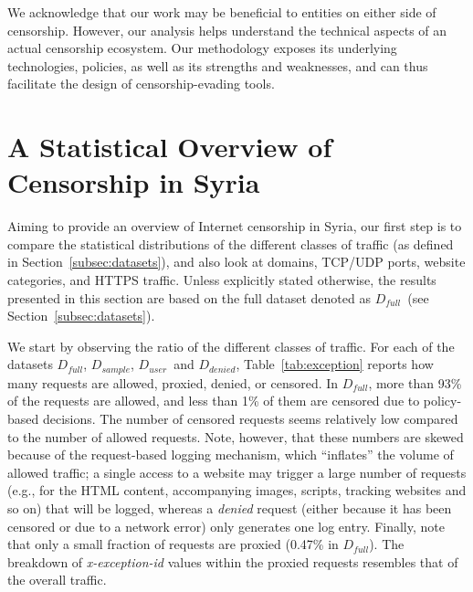 \documentclass{sig-alternate-2013}
\newcommand{\descr}[1]{\smallskip\noindent{\bf #1}}
\def\df{$D_{full}$\xspace}
\def\dd{$D_{denied}$\xspace}
\def\du{$D_{user}$\xspace}
\def\ds{$D_{sample}$\xspace}
\begin{document}
We acknowledge that our work may be beneficial to entities on 
either side of censorship. However, our analysis helps understand the technical aspects of an actual censorship ecosystem. Our methodology exposes its
underlying technologies, policies, as well as its strengths and weaknesses, and can thus facilitate the design of censorship-evading tools.







\section{A Statistical Overview of\\ Censorship in Syria}
\label{sec:general_characteristics}

Aiming to provide an overview of Internet censorship in Syria,
our first step is to compare the statistical distributions of the different classes of traffic (as defined in Section~\ref{subsec:datasets}), and also look at domains, TCP/UDP ports, website categories, and HTTPS traffic.
Unless explicitly stated otherwise, the results presented in this section are based on the full dataset denoted as \df\ (see Section~\ref{subsec:datasets}).



\descr{Traffic distribution.} We start by observing the ratio of the different classes of traffic. For each of the datasets \df, \ds, \du\ and \dd, 
Table~\ref{tab:exception} reports how many requests are allowed, proxied, denied, or censored. 
In \df, more than 93\% of the requests are allowed, and less than 1\% of them are censored due to policy-based decisions. The number of censored requests seems relatively low compared to the  number of allowed requests. Note, however, that these numbers are skewed because of the request-based logging mechanism, which ``inflates'' the volume of allowed traffic; a single access to a website may trigger a large number of requests (e.g., for the HTML content, accompanying images, scripts, tracking websites and so on) that will be logged, whereas a \emph{denied} request (either because it has been censored or due to a network error) only generates one log entry. 
Finally, note that only a small fraction of requests are proxied (0.47\% in \df). The breakdown of \emph{x-exception-id} values within the proxied requests resembles that of the overall traffic. 
\end{document}
